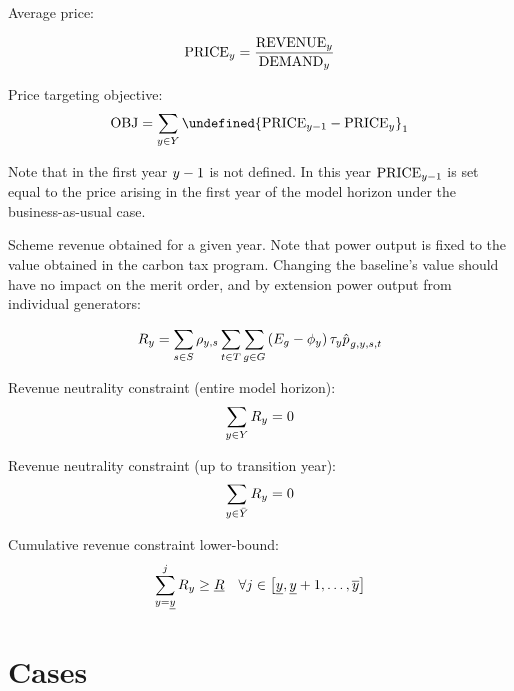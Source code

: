 \documentclass{article}
\let\norm\undefined %
\DeclarePairedDelimiter\norm{\lVert}{\rVert}
\begin{document}
Average price:

\begin{equation}
	\mathrm{PRICE}_{\iYear} = \frac{\mathrm{REVENUE}_{\iYear}}{\mathrm{DEMAND}_{\iYear}}
\end{equation}

Price targeting objective:
\begin{equation}
	\mathrm{OBJ} = \sum\limits_{\iYear \in \sYears} \norm{\mathrm{PRICE}_{\iYear-1} - \mathrm{PRICE}_{\iYear}}_{1}
\end{equation}

Note that in the first year $\iYear - 1$ is not defined. In this year $\mathrm{PRICE}_{\iYear-1}$ is set equal to the price arising in the first year of the model horizon under the business-as-usual case.

Scheme revenue obtained for a given year. Note that power output is fixed to the value obtained in the carbon tax program. Changing the baseline's value should have no impact on the merit order, and by extension power output from individual generators:

\begin{equation}
	R_{\iYear} = \sum\limits_{\iScenario \in \sScenarios} \cScenarioDuration \sum\limits_{\iInterval \in \sIntervals} \sum\limits_{\iGenerator \in \sGenerators} \left(\cEmissionsIntensity - \vBaseline \right) \vPermitPrice \hat{\vPower[]}_{\iGenerator,\iYear,\iScenario,\iInterval}
\end{equation}

Revenue neutrality constraint (entire model horizon):
\begin{equation}
	\sum\limits_{\iYear \in \sYears} R_{\iYear} = 0
\end{equation}

Revenue neutrality constraint (up to transition year):
\begin{equation}
	\sum\limits_{\iYear \in \bar{\sYears}} R_{\iYear} = 0
\end{equation}

Cumulative revenue constraint lower-bound:
\begin{equation}
	\sum\limits_{\iYear=\iYearStart}^{\iYearAlias} R_{\iYear} \geq \underline{R} \quad \forall \iYearAlias \in \left[\iYearStart, \iYearStart + 1, \ldots, \iYearTerminal \right] 
\end{equation}

\section{Cases}
\end{document}
